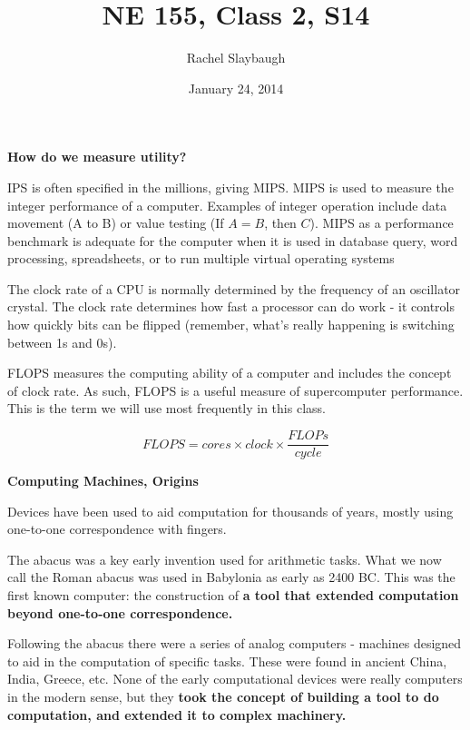 \documentclass[12pt]{article}
\title{NE 155, Class 2, S14}
\author{Rachel Slaybaugh}
\date{January 24, 2014}
\begin{document}
\maketitle

\noindent \textbf{How do we measure utility?}

IPS is often specified in the millions, giving MIPS. MIPS is used to measure the integer performance of a computer. Examples of integer operation include data movement (A to B) or value testing (If $A = B$, then $C$). MIPS as a performance benchmark is adequate for the computer when it is used in database query, word processing, spreadsheets, or to run multiple virtual operating systems %

The clock rate of a CPU is normally determined by the frequency of an oscillator crystal. The clock rate determines how fast a processor can do work - it controls how quickly bits can be flipped (remember, what's really happening is switching between 1s and 0s).

FLOPS measures the computing ability of a computer and includes the concept of clock rate. As such, FLOPS is a useful measure of supercomputer performance. This is the term we will use most frequently in this class. 

\begin{equation}
FLOPS = cores \times clock \times \frac{FLOPs}{cycle} \nonumber
\end{equation}

\vspace*{2em}
\noindent \textbf{Computing Machines, Origins}

Devices have been used to aid computation for thousands of years, mostly using one-to-one correspondence with fingers. 

The abacus was a key early invention used for arithmetic tasks. What we now call the Roman abacus was used in Babylonia as early as 2400 BC. This was the first known computer: the construction of \textbf{a tool that extended computation beyond one-to-one correspondence.} 

Following the abacus there were a series of analog computers - machines designed to aid in the computation of specific tasks. These were found in ancient China, India, Greece, etc. None of the early computational devices were really computers in the modern sense, but they \textbf{took the concept of building a tool to do computation, and extended it to complex machinery.}
\end{document}

